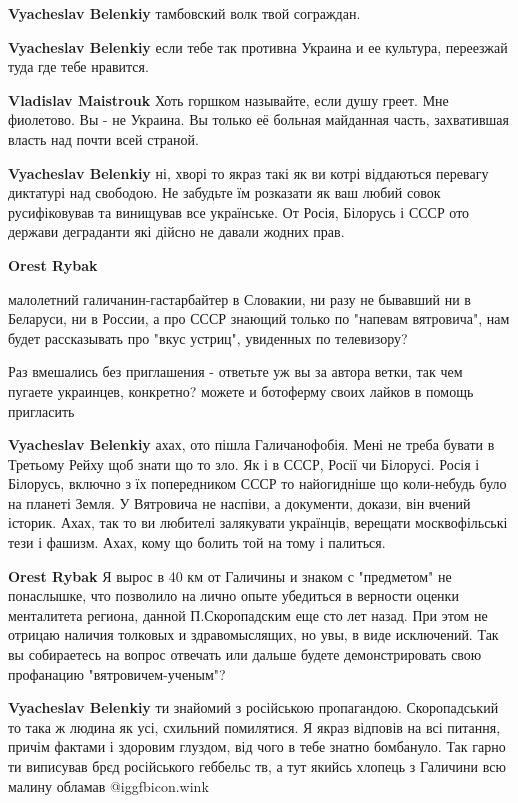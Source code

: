 \begin{itemize}
\begin{itemize}
\textbf{Vyacheslav Belenkiy} тамбовский волк твой сограждан.

\textbf{Vyacheslav Belenkiy} если тебе так противна Украина и ее культура, переезжай туда где тебе нравится.

\textbf{Vladislav Maistrouk}
Хоть горшком называйте, если душу греет. Мне фиолетово.
Вы - не Украина. Вы только её больная майданная часть, захватившая власть над почти всей страной.

\textbf{Vyacheslav Belenkiy} ні, хворі то якраз такі як ви котрі віддаються перевагу диктатурі над свободою. Не забудьте їм розказати як ваш любий совок русифіковував та винищував все українське. От Росія, Білорусь і СССР ото держави деграданти які дійсно не давали жодних прав.

\textbf{Orest Rybak} 

малолетний галичанин-гастарбайтер в Словакии, ни разу не бывавший ни в
Беларуси, ни в России, а про СССР знающий только по "напевам вятровича", нам
будет рассказывать про "вкус устриц", увиденных по телевизору?

Раз вмешались без приглашения - ответьте уж вы за автора ветки, так чем пугаете
украинцев, конкретно? можете и ботоферму своих лайков в помощь пригласить

\textbf{Vyacheslav Belenkiy} ахах, ото пішла Галичанофобія. Мені не треба бувати в Третьому Рейху щоб знати що то зло. Як і в СССР, Росії чи Білорусі. Росія і Білорусь, включно з їх попередником СССР то найогидніше що коли-небудь було на планеті Земля. У Вятровича не наспіви, а документи, докази, він вчений історик. Ахах, так то ви любителі залякувати українців, верещати москвофільські тези і фашизм. Ахах, кому що болить той на тому і палиться.

\textbf{Orest Rybak} Я вырос в 40 км от Галичины и знаком с "предметом" не понаслышке, что позволило на лично опыте убедиться в верности оценки менталитета региона, данной П.Скоропадским еще сто лет назад.
При этом не отрицаю наличия толковых и здравомыслящих, но увы, в виде исключений.
Так вы собираетесь на вопрос отвечать или дальше будете демонстрировать свою профанацию "вятровичем-ученым"?

\textbf{Vyacheslav Belenkiy} ти знайомий з російською пропагандою. Скоропадський то така ж людина як усі, схильний помилятися. Я якраз відповів на всі питання, причім фактами і здоровим глуздом, від чого в тебе знатно бомбануло. Так гарно ти виписував брєд російського геббельс тв, а тут якийсь хлопець з Галичини всю малину обламав @igg{fbicon.wink} 


\end{itemize}
\end{itemize}
